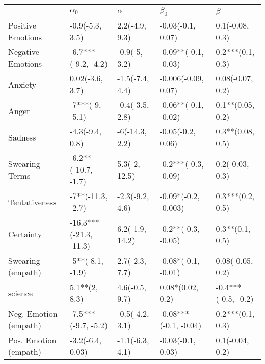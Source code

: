 \begin{tabular}{lllll}
\toprule
{} &              $\alpha_0$ &         $\alpha$ &              $\beta_0$ &              $\beta$ \\
\midrule
Positive Emotions     &         -0.9(-5.3, 3.5) &   2.2(-4.9, 9.3) &      -0.03(-0.1, 0.07) &      0.1(-0.08, 0.3) \\
Negative Emotions     &     -6.7***(-9.2, -4.2) &    -0.9(-5, 3.2) &   -0.09**(-0.1, -0.03) &     0.2***(0.1, 0.3) \\
Anxiety               &         0.02(-3.6, 3.7) &  -1.5(-7.4, 4.4) &    -0.006(-0.09, 0.07) &     0.08(-0.07, 0.2) \\
Anger                 &         -7***(-9, -5.1) &  -0.4(-3.5, 2.8) &   -0.06**(-0.1, -0.02) &     0.1**(0.05, 0.2) \\
Sadness               &         -4.3(-9.4, 0.8) &   -6(-14.3, 2.2) &      -0.05(-0.2, 0.06) &     0.3**(0.08, 0.5) \\
Swearing Terms        &     -6.2**(-10.7, -1.7) &    5.3(-2, 12.5) &   -0.2***(-0.3, -0.09) &      0.2(-0.03, 0.3) \\
Tentativeness         &       -7**(-11.3, -2.7) &  -2.3(-9.2, 4.6) &   -0.09*(-0.2, -0.003) &     0.3***(0.2, 0.5) \\
Certainty             &  -16.3***(-21.3, -11.3) &  6.2(-1.9, 14.2) &    -0.2**(-0.3, -0.05) &      0.3**(0.1, 0.5) \\
Swearing (empath)     &        -5**(-8.1, -1.9) &   2.7(-2.3, 7.7) &    -0.08*(-0.1, -0.01) &     0.08(-0.05, 0.2) \\
science               &           5.1**(2, 8.3) &   4.6(-0.5, 9.7) &       0.08*(0.02, 0.2) &  -0.4***(-0.5, -0.2) \\
Neg. Emotion (empath) &     -7.5***(-9.7, -5.2) &  -0.5(-4.2, 3.1) &  -0.08***(-0.1, -0.04) &     0.2***(0.1, 0.3) \\
Pos. Emotion (empath) &        -3.2(-6.4, 0.03) &  -1.1(-6.3, 4.1) &      -0.03(-0.1, 0.03) &      0.1(-0.04, 0.2) \\
\bottomrule
\end{tabular}
